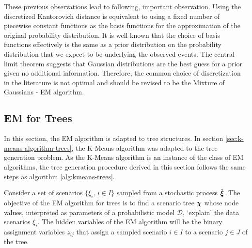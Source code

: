 These previous observations lead to following, important observation.
Using the discretized Kantorovich distance is equivalent to using a fixed number of piecewise constant functions as the basis functions for the approximation of the original probability distribution.
It is well known that the choice of basis functions effectively is the same as a prior distribution on the probability distribution that we expect to be underlying the observed events.
The central limit theorem suggests that Gaussian distributions are the best guess for a prior given no additional information.
Therefore, the common choice of discretization in the literature \cite{Dupacova2003} is not optimal and should be revised to be the Mixture of Gaussians - EM algorithm.

\subsection{EM for Trees}
\label{sec:mixt-gauss-trees}
In this section, the EM algorithm is adapted to tree structures.
In section \ref{sec:k-means-algorithm-trees}, the K-Means algorithm was adapted to the tree generation problem.
As the K-Means algorithm is an instance of the class of EM algorithms, the tree generation procedure derived in this section follows the same steps as algorithm \ref{alg:kmeans-trees}.

Consider a set of scenarios $\{\xi_i,\, i\in I\}$ sampled from a stochastic process $\hat{\boldsymbol\xi}$.
The objective of the EM algorithm for trees is to find a scenario tree $\boldsymbol\chi$ whose node values, interpreted as parameters of a probabilistic model $\mathcal{D}$, `explain' the data scenarios $\xi_i$.
The hidden variables of the EM algorithm will be the binary assignment variables $z_{ij}$ that assign a sampled scenario $i\in I$ to a scenario $j\in J$ of the tree.

